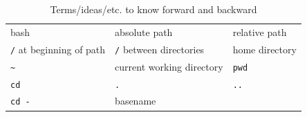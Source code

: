 \documentclass[]{krantz}
\begin{document}
\begin{longtable}[]{@{}lll@{}}
\caption{\label{tab:unix-chap-review} Terms/ideas/etc. to know forward and backward}\tabularnewline
\toprule
\endhead
\begin{minipage}[t]{0.34\columnwidth}\raggedright
bash\strut
\end{minipage} & \begin{minipage}[t]{0.35\columnwidth}\raggedright
absolute path\strut
\end{minipage} & \begin{minipage}[t]{0.22\columnwidth}\raggedright
relative path\strut
\end{minipage}\tabularnewline
\begin{minipage}[t]{0.34\columnwidth}\raggedright
\texttt{/} at beginning of path\strut
\end{minipage} & \begin{minipage}[t]{0.35\columnwidth}\raggedright
\texttt{/} between directories\strut
\end{minipage} & \begin{minipage}[t]{0.22\columnwidth}\raggedright
home directory\strut
\end{minipage}\tabularnewline
\begin{minipage}[t]{0.34\columnwidth}\raggedright
\texttt{\textasciitilde{}}\strut
\end{minipage} & \begin{minipage}[t]{0.35\columnwidth}\raggedright
current working directory\strut
\end{minipage} & \begin{minipage}[t]{0.22\columnwidth}\raggedright
\texttt{pwd}\strut
\end{minipage}\tabularnewline
\begin{minipage}[t]{0.34\columnwidth}\raggedright
\texttt{cd}\strut
\end{minipage} & \begin{minipage}[t]{0.35\columnwidth}\raggedright
\texttt{.}\strut
\end{minipage} & \begin{minipage}[t]{0.22\columnwidth}\raggedright
\texttt{..}\strut
\end{minipage}\tabularnewline
\begin{minipage}[t]{0.34\columnwidth}\raggedright
\texttt{cd\ -}\strut
\end{minipage} & \begin{minipage}[t]{0.35\columnwidth}\raggedright
basename\strut
\end{minipage} & \begin{minipage}[t]{0.22\columnwidth}\raggedright

\end{minipage}
\end{longtable}
\end{document}
